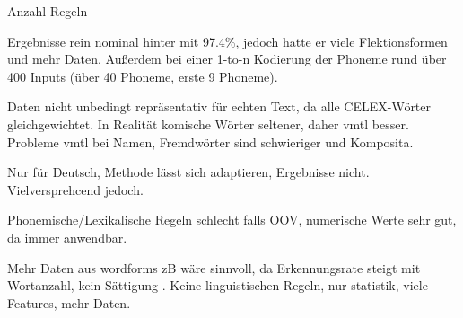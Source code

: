 Anzahl Regeln \cite{Rapp1995}

Ergebnisse rein nominal hinter \cite{Hain2004} mit 97.4\%, jedoch hatte er viele Flektionsformen und mehr Daten. Außerdem bei einer 1-to-n Kodierung der Phoneme rund über 400 Inputs (über 40 Phoneme, erste 9 Phoneme).

Daten nicht unbedingt repräsentativ für echten Text, da alle CELEX-Wörter gleichgewichtet. In Realität komische Wörter seltener, daher vmtl besser. Probleme vmtl bei Namen, Fremdwörter sind schwieriger und Komposita.

Nur für Deutsch, Methode lässt sich adaptieren, Ergebnisse nicht. Vielversprehcend jedoch.

Phonemische/Lexikalische Regeln schlecht falls OOV, numerische Werte sehr gut, da immer anwendbar.

Mehr Daten aus wordforms zB wäre sinnvoll, da Erkennungsrate steigt mit Wortanzahl, kein Sättigung \cite[S.~123]{Dou&Bergsma2009}.
Keine linguistischen Regeln, nur statistik, viele Features, mehr Daten. \cite{Dou&Bergsma2009}





